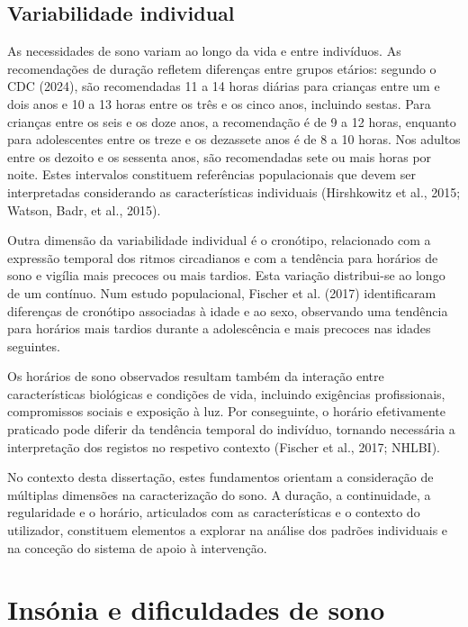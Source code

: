 \subsection{Variabilidade individual}
\label{sec:chap2_variabilidade}

As necessidades de sono variam ao longo da vida e entre indivíduos. As recomendações de duração refletem diferenças entre grupos etários: segundo o CDC (2024), são recomendadas 11 a 14 horas diárias para crianças entre um e dois anos e 10 a 13 horas entre os três e os cinco anos, incluindo sestas. Para crianças entre os seis e os doze anos, a recomendação é de 9 a 12 horas, enquanto para adolescentes entre os treze e os dezassete anos é de 8 a 10 horas. Nos adultos entre os dezoito e os sessenta anos, são recomendadas sete ou mais horas por noite. Estes intervalos constituem referências populacionais que devem ser interpretadas considerando as características individuais (Hirshkowitz et al., 2015; Watson, Badr, et al., 2015).

Outra dimensão da variabilidade individual é o cronótipo, relacionado com a expressão temporal dos ritmos circadianos e com a tendência para horários de sono e vigília mais precoces ou mais tardios. Esta variação distribui-se ao longo de um contínuo. Num estudo populacional, Fischer et al. (2017) identificaram diferenças de cronótipo associadas à idade e ao sexo, observando uma tendência para horários mais tardios durante a adolescência e mais precoces nas idades seguintes.

Os horários de sono observados resultam também da interação entre características biológicas e condições de vida, incluindo exigências profissionais, compromissos sociais e exposição à luz. Por conseguinte, o horário efetivamente praticado pode diferir da tendência temporal do indivíduo, tornando necessária a interpretação dos registos no respetivo contexto (Fischer et al., 2017; NHLBI).

No contexto desta dissertação, estes fundamentos orientam a consideração de múltiplas dimensões na caracterização do sono. A duração, a continuidade, a regularidade e o horário, articulados com as características e o contexto do utilizador, constituem elementos a explorar na análise dos padrões individuais e na conceção do sistema de apoio à intervenção.

\section{Insónia e dificuldades de sono} 
\label{sec:chap2_insomnia} %

